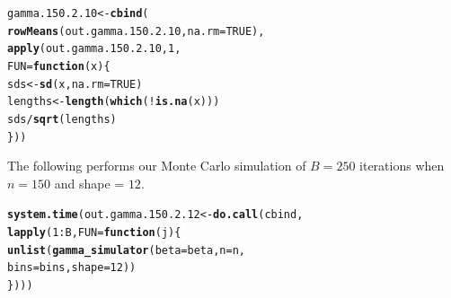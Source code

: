 \documentclass[11pt]{article}\usepackage[]{graphicx}\usepackage[]{color}
\makeatletter
\newcommand{\hlnum}[1]{\textcolor[rgb]{0.686,0.059,0.569}{#1}}%
\newcommand{\hlopt}[1]{\textcolor[rgb]{0,0,0}{#1}}%
\newcommand{\hlstd}[1]{\textcolor[rgb]{0.345,0.345,0.345}{#1}}%
\newcommand{\hlkwa}[1]{\textcolor[rgb]{0.161,0.373,0.58}{\textbf{#1}}}%
\newcommand{\hlkwb}[1]{\textcolor[rgb]{0.69,0.353,0.396}{#1}}%
\newcommand{\hlkwc}[1]{\textcolor[rgb]{0.333,0.667,0.333}{#1}}%
\newcommand{\hlkwd}[1]{\textcolor[rgb]{0.737,0.353,0.396}{\textbf{#1}}}%
\newenvironment{kframe}{%
 \def\at@end@of@kframe{}%
 \ifinner\ifhmode%
  \def\at@end@of@kframe{\end{minipage}}%
  \begin{minipage}{\columnwidth}%
 \fi\fi%
 \def\FrameCommand##1{\hskip\@totalleftmargin \hskip-\fboxsep
 \colorbox{shadecolor}{##1}\hskip-\fboxsep
     \hskip-\linewidth \hskip-\@totalleftmargin \hskip\columnwidth}%
 \MakeFramed {\advance\hsize-\width
   \@totalleftmargin\z@ \linewidth\hsize
   \@setminipage}}%
 {\par\unskip\endMakeFramed%
 \at@end@of@kframe}
\newenvironment{knitrout}{}{} %
\makeatother
\begin{document}
\begin{knitrout}
\color{fgcolor}\begin{kframe}
\begin{alltt}
\hlstd{gamma.150.2.10} \hlkwb{<-} \hlkwd{cbind}\hlstd{(}
  \hlkwd{rowMeans}\hlstd{(out.gamma.150.2.10,} \hlkwc{na.rm} \hlstd{=} \hlnum{TRUE}\hlstd{),}
  \hlkwd{apply}\hlstd{(out.gamma.150.2.10,} \hlnum{1}\hlstd{,}
  \hlkwc{FUN} \hlstd{=} \hlkwa{function}\hlstd{(}\hlkwc{x}\hlstd{)\{}
    \hlstd{sds} \hlkwb{<-} \hlkwd{sd}\hlstd{(x,} \hlkwc{na.rm} \hlstd{=} \hlnum{TRUE}\hlstd{)}
    \hlstd{lengths} \hlkwb{<-} \hlkwd{length}\hlstd{(}\hlkwd{which}\hlstd{(}\hlopt{!}\hlkwd{is.na}\hlstd{(x)))}
    \hlstd{sds} \hlopt{/} \hlkwd{sqrt}\hlstd{(lengths)}
  \hlstd{\}))}
\end{alltt}


{\ttfamily\noindent\bfseries\color{errorcolor}{\#\# Error in is.data.frame(x): object 'out.gamma.150.2.10' not found}}\end{kframe}
\end{knitrout}

The following performs our Monte Carlo simulation of $B = 250$ iterations 
when $n = 150$ and shape = $12$.

\begin{knitrout}
\color{fgcolor}\begin{kframe}
\begin{alltt}
\hlkwd{system.time}\hlstd{(out.gamma.150.2.12} \hlkwb{<-} \hlkwd{do.call}\hlstd{(cbind,}
  \hlkwd{lapply}\hlstd{(}\hlnum{1}\hlopt{:}\hlstd{B,} \hlkwc{FUN} \hlstd{=} \hlkwa{function}\hlstd{(}\hlkwc{j}\hlstd{)\{}
    \hlkwd{unlist}\hlstd{(}\hlkwd{gamma_simulator}\hlstd{(}\hlkwc{beta} \hlstd{= beta,} \hlkwc{n} \hlstd{= n,}
      \hlkwc{bins} \hlstd{= bins,} \hlkwc{shape} \hlstd{=} \hlnum{12}\hlstd{))}
\hlstd{\})))}
\end{alltt}


{\ttfamily\noindent\bfseries\color{errorcolor}{\#\# Error in eval(predvars, data, env): object 'x1' not found}}

{\ttfamily\noindent\itshape\color{messagecolor}{\#\# Timing stopped at: 0.003 0 0.003}}\end{kframe}
\end{knitrout}
\end{document}
